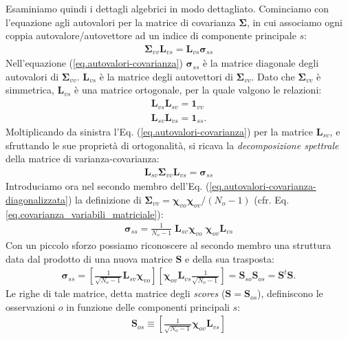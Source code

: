 \documentclass[11pt]{amsart}
\begin{document}
Esaminiamo quindi i dettagli algebrici in modo dettagliato. Cominciamo con l'equazione agli autovalori per la matrice di covarianza $\bm \Sigma$, in cui associamo ogni coppia autovalore/autovettore ad un indice di componente principale $s$:
%
\begin{eqnarray}
\label{eq.autovalori-covarianza}
\bm \Sigma_{vv} \bm L_{vs} = \bm L_{vs} \bm \sigma_{ss} 
\end{eqnarray}
%
Nell'equazione (\ref{eq.autovalori-covarianza}) $\bm \sigma_{ss}$ è la matrice diagonale degli autovalori di $\bm \Sigma_{vv}$. $\bm L_{vs}$ è la matrice degli autovettori di $\bm \Sigma_{vv}$. Dato che $\bm \Sigma_{vv}$ è simmetrica, $\bm L_{vs}$ è una matrice ortogonale, per la quale valgono le relazioni:
%
\begin{eqnarray}
\bm L_{vs} \bm L_{sv}  = \bm 1_{vv}
\\ \nonumber
\bm L_{sv} \bm L_{vs}  = \bm 1_{ss}. 
\end{eqnarray}
%
Moltiplicando da sinistra l'Eq. (\ref{eq.autovalori-covarianza}) per la matrice $\bm L_{sv}$, e sfruttando le sue proprietà di ortogonalità, si ricava la {\em decomposizione spettrale} della matrice di varianza-covarianza:
%
\begin{eqnarray}
\label{eq.autovalori-covarianza-diagonalizzata}
\bm L_{sv} \bm \Sigma_{vv} \bm L_{vs}
=
\bm \sigma_{ss}
\end{eqnarray}
%
Introduciamo ora nel secondo membro dell'Eq. (\ref{eq.autovalori-covarianza-diagonalizzata}) la definizione di $\bm \Sigma_{vv} = \bm \chi_{vo} \bm \chi_{ov} / (N_o-1)$ (cfr. Eq. \ref{eq.covarianza_variabili_matriciale}): 
%
\begin{eqnarray}
\bm \sigma_{ss} =
\frac{1}{N_o - 1} \; \bm L_{sv} \bm \chi_{vo} \; \bm \chi_{ov} \bm L_{vs} 
\end{eqnarray}
%
Con un piccolo sforzo possiamo riconoscere al secondo membro una struttura data dal prodotto di una nuova matrice $\bm S$ e della sua trasposta:
%
\begin{eqnarray}
\bm \sigma_{ss}
=
\left[ \frac{1}{\sqrt{N_o - 1}} \bm L_{sv} \bm \chi_{vo} \right]
\left[ \bm \chi_{ov} \bm L_{vs} \frac{1}{\sqrt{N_o - 1}} \right] 
=
\bm S_{so} \bm S_{os}
=
\bm S^t \bm S.
\end{eqnarray}
%
Le righe di tale matrice, detta matrice degli {\em scores} ($\bm S = \bm S_{os}$), definiscono le  osservazioni $o$ in funzione delle componenti principali $s$:
%
\begin{eqnarray}
\label{eq.scores}
\bm S_{os} \equiv \left[ \frac{1}{\sqrt{N_o - 1}} \bm \chi_{ov} \bm L_{vs} \right]
\end{eqnarray}
\end{document}
